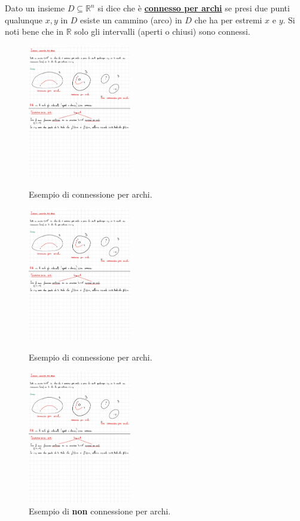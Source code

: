 \documentclass[a4paper]{article}
\begin{document}
	Dato un insieme $D \subseteq \mathbb{R}^{n}$ si dice che è \textcolor{Red3}{\textbf{\underline{connesso per archi}}} se presi due punti qualunque $x,y$ in $D$ esiste un cammino (arco) in $D$ che ha per estremi $x$ e $y$. Si noti bene che in $\mathbb{R}$ solo gli intervalli (aperti o chiusi) sono connessi.
	
	\begin{figure}[!htp]
		\centering
		\includegraphics[width=0.4\textwidth]{img/connesso_per_archi1.pdf}
		\caption{Esempio di connessione per archi.}
		\includegraphics[width=0.4\textwidth]{img/connesso_per_archi2.pdf}
		\caption{Esempio di connessione per archi.}
		\includegraphics[width=0.4\textwidth]{img/connesso_per_archi3.pdf}
		\caption{Esempio di \textbf{non} connessione per archi.}
	\end{figure}
\end{document}
